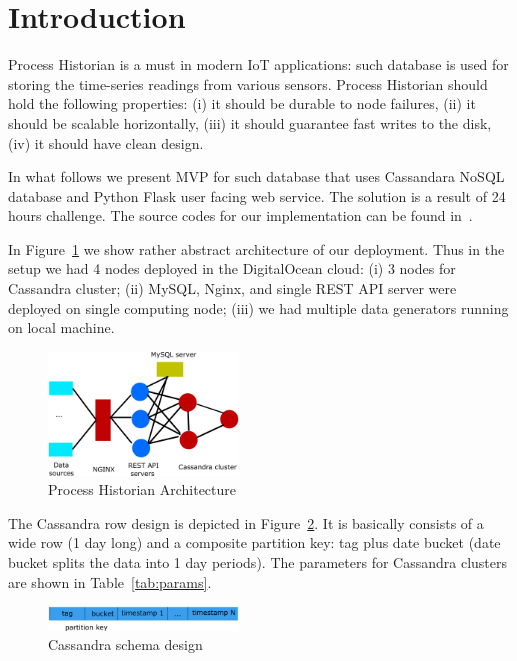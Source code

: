 \section{Introduction}
\label{section:introduction}

Process Historian is a must in modern IoT applications:
such database is used for storing the time-series readings
from various sensors. Process Historian should hold
the following properties: (i) it should be durable to node failures,
(ii) it should be scalable horizontally, (iii) it should guarantee 
fast writes to the disk, (iv) it should have clean design.

In what follows we present MVP for such database that uses 
Cassandara NoSQL database and Python Flask user facing 
web service. The solution is a result of 24 hours challenge.
The source codes for our implementation can be found 
in~\cite{git}.


In Figure~\ref{fig:arch} we show rather abstract architecture of our deployment.
Thus in the setup we had 4 nodes deployed in the DigitalOcean
cloud: (i) 3 nodes for Cassandra cluster; (ii) MySQL, Nginx,
and single REST API server were deployed on single computing node;
(iii) we had multiple data generators running on local machine.

\begin{figure}[!hbt]\centering
  \includegraphics[width=0.45\textwidth]{graphics/arch.png}
  \caption{Process Historian Architecture}
  \label{fig:arch}
\end{figure}

The Cassandra row design is depicted in Figure~\ref{fig:schema}.
It is basically consists of a wide row (1 day long) and a composite
partition key: tag plus date bucket (date bucket splits the data 
into 1 day periods). The parameters for Cassandra 
clusters are shown in Table~\ref{tab:params}.

\begin{figure}[!hbt]\centering
  \includegraphics[width=0.45\textwidth]{graphics/schema.png}
  \caption{Cassandra schema design}
  \label{fig:schema}
\end{figure}


